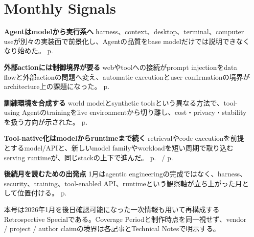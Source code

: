 \section*{Monthly Signals}
\smallskip
\noindent\textbf{Agentはmodelから実行系へ} harness、context、desktop、terminal、computer useが別々の実装面で前景化し、Agentの品質をbase modelだけでは説明できなくなり始めた。 \hfill{\footnotesize p.~\pageref{pkg:agent-stack-leaves-chat}}\par
\smallskip
\noindent\textbf{外部actionには制御境界が要る} webやtoolへの接続がprompt injectionをdata flowと外部actionの問題へ変え、automatic executionとuser confirmationの境界がarchitecture上の課題になった。 \hfill{\footnotesize p.~\pageref{pkg:autonomy-needs-guardrails}}\par
\smallskip
\noindent\textbf{訓練環境を合成する} world modelとsynthetic toolsという異なる方法で、tool-using Agentのtrainingをlive environmentから切り離し、cost・privacy・stabilityを扱う方向が示された。 \hfill{\footnotesize p.~\pageref{pkg:training-agents-offline}}\par
\smallskip
\noindent\textbf{Tool-native化はmodelからruntimeまで続く} retrievalやcode executionを前提とするmodel/APIと、新しいmodel familyやworkloadを短い周期で取り込むserving runtimeが、同じstackの上下で進んだ。 \hfill{\footnotesize p.~\pageref{pkg:tool-native-models} / p.~\pageref{pkg:runtime-catches-the-agent-wave}}\par
\smallskip
\noindent\textbf{後続月を読むための出発点} 1月はagentic engineeringの完成ではなく、harness、security、training、tool-enabled API、runtimeという観察軸が立ち上がった月として位置付ける。 \hfill{\footnotesize p.~\pageref{pkg:closing-synthesis}}\par
\medskip
\begin{claimboundary}
本号は2026年1月を後日確認可能になった一次情報も用いて再構成するRetrospective Specialである。Coverage Periodと制作時点を同一視せず、vendor / project / author claimの境界は各記事とTechnical Notesで明示する。
\end{claimboundary}
\medskip
\setcounter{tocdepth}{1}
\tableofcontents
